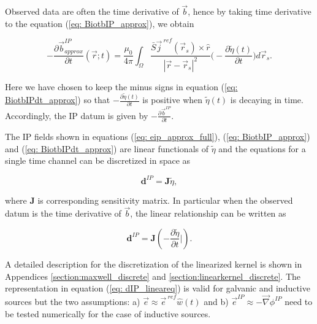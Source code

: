 \documentclass[extra,mreferee]{gji}
\newcommand{\grad}{\vec \nabla}
\renewcommand {\j}  { {\vec j} }
\renewcommand {\b}  { {\vec b} }
\newcommand {\e}  { {\vec e} }
\newcommand{\peta}{\tilde{\eta}}
\newcommand{\eref}{\e^{\ ref}}
\newcommand{\jref}{\j^{\ ref}}
\begin{document}
Observed data are often the time derivative of $\b$, hence by taking time derivative to the equation (\ref{eq: BiotbIP_approx}), we obtain
\begin{linenomath*}
\begin{equation}
  -\frac{\partial\b^{IP}_{approx}}{\partial t}(\vec{r}; t) = \frac{\mu_0}{4\pi} \int_{\Omega}  \frac{\bar{S}\jref(\vec{r}_s)\times\hat{r}}{|\vec{r}-\vec{r}_s|^2} \Big( -\frac{\partial \peta(t)}{\partial t} \Big) d\vec{r}_s.
  \label{eq: BiotbIPdt_approx}
\end{equation}
\end{linenomath*}
Here we have chosen to keep the minus signs in equation (\ref{eq: BiotbIPdt_approx}) so that $-\frac{\partial \peta(t)}{\partial t}$ is positive when $\peta(t)$ is decaying in time. 
Accordingly, the IP datum is given by  $-\frac{\partial\b^{IP}}{\partial t}$. 

The IP fields shown in equations (\ref{eq: eip_approx_full}), (\ref{eq: BiotbIP_approx}) and (\ref{eq: BiotbIPdt_approx}) are linear functionals of $\peta$ and the equations for a single time channel can be discretized in space as
\begin{linenomath*}
\begin{equation}
  \mathbf{d}^{IP} = \mathbf{J}\peta,
  \label{eq: dIP_lineareq}
\end{equation}
\end{linenomath*}
where $\mathbf{J}$ is corresponding sensitivity matrix. 
In particular when the observed datum is the time derivative of $\b$, the linear relationship can be written as 
\begin{linenomath*}
\begin{equation}
  \mathbf{d}^{IP} = \mathbf{J}(-\frac{\partial \peta}{\partial t}\Big|).
  \label{eq: dIP_lineareq_dbdt}
\end{equation}
\end{linenomath*}
A detailed description for the discretization of the linearized kernel is shown in Appendices \ref{section:maxwell_discrete} and \ref{section:linearkernel_discrete}. 
The representation in equation (\ref{eq: dIP_lineareq}) is valid for galvanic and inductive sources but the two assumptions: a) $\e \approx \eref \hat{w}(t)$ and b) $\e^{IP} \approx -\grad\phi^{IP}$ need to be tested numerically for the case of inductive sources. 

\end{document}
